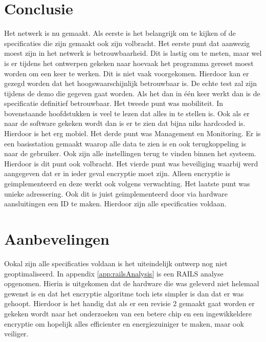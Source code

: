 \section{Conclusie}
Het netwerk is nu gemaakt. Als eerste is het belangrijk om te kijken of de specificaties die zijn gemaakt ook zijn volbracht.
Het eerste punt dat aanwezig moest zijn in het netwerk is betrouwbaarheid. Dit is lastig om te meten, maar wel is er tijdens het ontwerpen 
gekeken naar hoevaak het programma gereset moest worden om een keer te werken. Dit is niet vaak voorgekomen. Hierdoor kan er gezegd worden dat 
het hoogswaarschijnlijk betrouwbaar is. De echte test zal zijn tijdens de demo die gegeven gaat worden. Als het dan in één keer werkt dan is 
de specificatie definitief betrouwbaar. Het tweede punt was mobiliteit. In bovenstaande hoofdstukken is veel te lezen dat alles in te stellen is.
Ook als er naar de software gekeken wordt dan is er te zien dat bijna niks hardcoded is. Hierdoor is het erg mobiel. Het derde punt was 
Management en Monitoring. Er is een basisstation gemaakt waarop alle data te zien is en ook terugkoppeling is naar de gebruiker. Ook zijn 
alle instellingen terug te vinden binnen het systeem. Hierdoor is dit punt ook volbracht. Het vierde punt was beveiliging waarbij werd aangegeven 
dat er in ieder geval encryptie moet zijn. Alleen encryptie is geimplementeerd en deze werkt ook volgens verwachting. Het laatste punt was 
unieke adressering. Ook dit is juist geimplementeerd door via hardware aansluitingen een ID te maken. 
Hierdoor zijn alle specificaties voldaan.

\section{Aanbevelingen}
Ookal zijn alle specificaties voldaan is het uiteindelijk ontwerp nog niet geoptimaliseerd. In appendix \ref{app:railsAnalysis} is een RAILS 
analyse opgenomen. Hierin is uitgekomen dat de hardware die was geleverd niet helemaal gewenst is en dat het encryptie algoritme toch iets 
simpler is dan dat er was gehoopt. Hierdoor is het handig dat als er een revisie 2 gemaakt gaat worden er gekeken wordt naar het onderzoeken van 
een betere chip en een ingewikkeldere encryptie om hopelijk alles efficienter en energiezuiniger te maken, maar ook veiliger.
